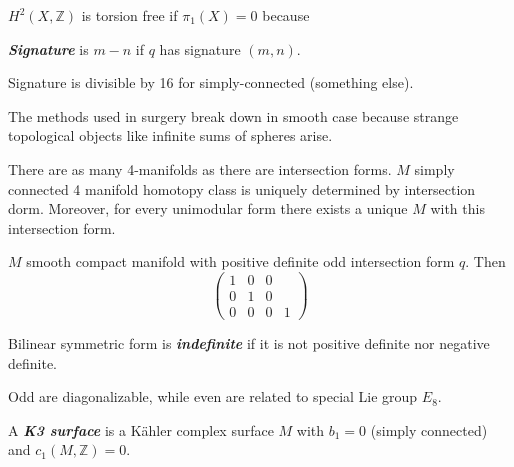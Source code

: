 \begin{coro}
	$H^2(X,\mathbb{Z})$ is torsion free if $\pi_{1}(X) =0$ because 
\end{coro}

\begin{defn}
	\textit{\textbf{Signature}} is $m-n$ if $q$ has signature $(m,n)$.
\end{defn}

\begin{thm}[Rokhlm-Wu?]\leavevmode
	Signature is divisible by 16 for simply-connected (something else).
\end{thm}

\begin{remark}
	The methods used in surgery break down in smooth case because strange topological objects like infinite sums of spheres arise.
\end{remark}

\begin{thm}[Freedman, 1982]
	There are as many 4-manifolds as there are intersection forms. $M$ simply connected 4 manifold homotopy class is uniquely determined by intersection dorm. Moreover, for every unimodular form there exists a unique $M$ with this intersection form.
\end{thm}

\begin{thm}[Donaldson, 1986]\leavevmode
	$M$ smooth compact manifold with positive definite odd intersection form $q$. Then
	\[\begin{pmatrix} 1&0&0\\0&1&0\\0&0&0&1 \end{pmatrix} \]
\end{thm}

\begin{defn}
	Bilinear symmetric form is \textit{\textbf{indefinite}} if it is not positive definite nor negative definite.
\end{defn}

\begin{thm}\leavevmode
	Odd are diagonalizable, while even are related to special Lie group $E_8$.
\end{thm}

\begin{defn}
	A \textit{\textbf{K3 surface}} is a K\"ahler complex surface $M$ with $b_1=0$ (simply connected) and $c_1(M,\mathbb{Z})=0$.
\end{defn}

